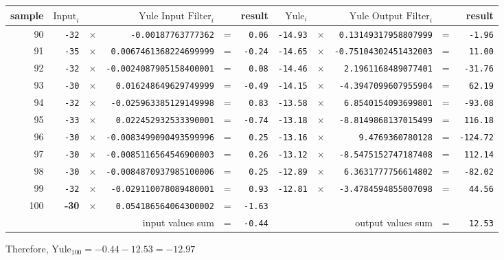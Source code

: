 \begin{table}[h]
{
\begin{tabular}{|r|rcrcr|rcrcr|}
\hline
sample & $\text{Input}_i$ & & $\text{Yule Input Filter}_i$ & & result &
$\text{Yule}_i$ & & $\text{Yule Output Filter}_i$ & & result \\
\hline
90 & \texttt{-32} & $\times$ & \texttt{-0.00187763777362} & = & \texttt{0.06} &
\texttt{-14.93} & $\times$ & \texttt{0.13149317958807999} & = & \texttt{-1.96} \\

91 & \texttt{-35} & $\times$ & \texttt{0.0067461368224699999} & = & \texttt{-0.24} &
\texttt{-14.65} & $\times$ & \texttt{-0.75104302451432003} & = & \texttt{11.00} \\

92 & \texttt{-32} & $\times$ & \texttt{-0.0024087905158400001} & = & \texttt{0.08} &
\texttt{-14.46} & $\times$ & \texttt{2.1961168489077401} & = & \texttt{-31.76} \\

93 & \texttt{-30} & $\times$ & \texttt{0.016248649629749999} & = & \texttt{-0.49} &
\texttt{-14.15} & $\times$ & \texttt{-4.3947099607955904} & = & \texttt{62.19} \\

94 & \texttt{-32} & $\times$ & \texttt{-0.025963385129149998} & = & \texttt{0.83} &
\texttt{-13.58} & $\times$ & \texttt{6.8540154093699801} & = & \texttt{-93.08} \\

95 & \texttt{-33} & $\times$ & \texttt{0.022452932533390001} & = & \texttt{-0.74} &
\texttt{-13.18} & $\times$ & \texttt{-8.8149868137015499} & = & \texttt{116.18} \\

96 & \texttt{-30} & $\times$ & \texttt{-0.0083499090493599996} & = & \texttt{0.25} &
\texttt{-13.16} & $\times$ & \texttt{9.4769360780128} & = & \texttt{-124.72} \\

97 & \texttt{-30} & $\times$ & \texttt{-0.0085116564546900003} & = & \texttt{0.26} &
\texttt{-13.12} & $\times$ & \texttt{-8.5475152747187408} & = & \texttt{112.14} \\

98 & \texttt{-30} & $\times$ & \texttt{-0.0084870937985100006} & = & \texttt{0.25} &
\texttt{-12.89} & $\times$ & \texttt{6.3631777756614802} & = & \texttt{-82.02} \\

99 & \texttt{-32} & $\times$ & \texttt{-0.029110078089480001} & = & \texttt{0.93} &
\texttt{-12.81} & $\times$ & \texttt{-3.4784594855007098} & = & \texttt{44.56} \\

100 & \textbf{-30} & $\times$ & \texttt{0.054186564064300002} & = & \texttt{-1.63} &
& & & & \\
\hline
\multicolumn{4}{|r}{input values sum} & = & \texttt{-0.44} &
\multicolumn{3}{r}{output values sum} & = & \texttt{12.53} \\
\hline
\end{tabular}
}
\end{table}
\par
\noindent
Therefore, $\text{Yule}_{100} = -0.44 - 12.53 = -12.97$

